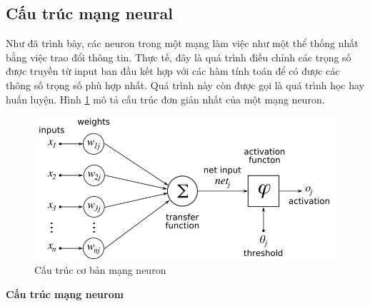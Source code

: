 	\subsection{Cấu trúc mạng neural}
	Như đã trình bày, các neuron trong một mạng làm việc như một thể thống nhất bằng việc trao đổi thông tin. Thực tế, đây là quá trình điều chỉnh các trọng số được truyền từ input ban đầu kết hợp với các hàm tính toán để có được các thông số trọng số phù hợp nhất. Quá trình này còn được gọi là quá trình học hay huấn luyện. Hình \ref{fig:NN} mô tả cấu trúc đơn giản nhất của một mạng neuron.
	\begin{figure}[h!]
		\centering
		\includegraphics[scale=0.4]{charts/NN.png}
		\caption{Cấu trúc cơ bản mạng neuron}
		\label{fig:NN}
	\end{figure}
	
	\textbf{Cấu trúc mạng neuron\i}
	

